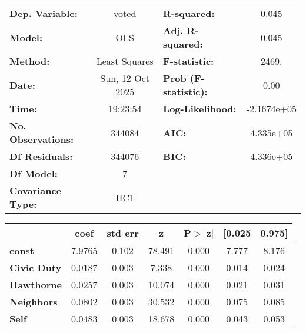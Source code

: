 \begin{center}
\begin{tabular}{lclc}
\toprule
\textbf{Dep. Variable:}        &      voted       & \textbf{  R-squared:         } &      0.045   \\
\textbf{Model:}                &       OLS        & \textbf{  Adj. R-squared:    } &      0.045   \\
\textbf{Method:}               &  Least Squares   & \textbf{  F-statistic:       } &      2469.   \\
\textbf{Date:}                 & Sun, 12 Oct 2025 & \textbf{  Prob (F-statistic):} &      0.00    \\
\textbf{Time:}                 &     19:23:54     & \textbf{  Log-Likelihood:    } & -2.1674e+05  \\
\textbf{No. Observations:}     &      344084      & \textbf{  AIC:               } &  4.335e+05   \\
\textbf{Df Residuals:}         &      344076      & \textbf{  BIC:               } &  4.336e+05   \\
\textbf{Df Model:}             &           7      & \textbf{                     } &              \\
\textbf{Covariance Type:}      &       HC1        & \textbf{                     } &              \\
\bottomrule
\end{tabular}
\begin{tabular}{lcccccc}
                               & \textbf{coef} & \textbf{std err} & \textbf{z} & \textbf{P$> |$z$|$} & \textbf{[0.025} & \textbf{0.975]}  \\
\midrule
\textbf{const}                 &       7.9765  &        0.102     &    78.491  &         0.000        &        7.777    &        8.176     \\
\textbf{Civic Duty}            &       0.0187  &        0.003     &     7.338  &         0.000        &        0.014    &        0.024     \\
\textbf{Hawthorne}             &       0.0257  &        0.003     &    10.074  &         0.000        &        0.021    &        0.031     \\
\textbf{Neighbors}             &       0.0802  &        0.003     &    30.532  &         0.000        &        0.075    &        0.085     \\
\textbf{Self}                  &       0.0483  &        0.003     &    18.678  &         0.000        &        0.043    &        0.053     \\

\end{tabular}
\end{center}
